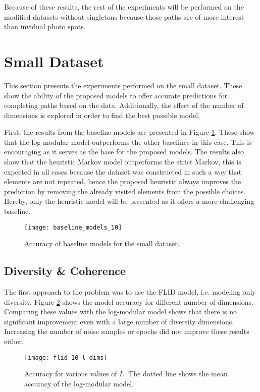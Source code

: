 Because of these results, the rest of the experiments will be performed on the modified datasets without singletons because those paths are of more interest than invidual photo spots.

\section{Small Dataset}

This section presents the experiments performed on the small dataset. These show the ability of the proposed models to offer accurate predictions for completing paths based on the data. Additionally, the effect of the number of dimensions is explored in order to find the best possible model.

First, the results from the baseline models are presented in Figure \ref{fig:small_baselines}. These show that the log-modular model outperforms the other baselines in this case. This is encouraging as it serves as the base for the proposed models. The results also show that the heuristic Markov model outperforms the strict Markov, this is expected in all cases because the dataset was constructed in such a way that elements are not repeated, hence the proposed heuristic always improves the prediction by removing the already visited elements from the possible choices. Hereby, only the heuristic model will be presented as it offers a more challenging baseline.

\begin{figure}
  \centering
  \texttt{[image: baseline\_models\_10]}
  \caption{Accuracy of baseline models for the small dataset.}
  \label{fig:small_baselines}
\end{figure}

\subsection{Diversity \& Coherence}

The first approach to the problem was to use the FLID model, i.e. modeling only diversity. Figure \ref{fig:flid_small_l_dims} shows the model accuracy for different number of dimensions. Comparing these values with the log-modular model shows that there is no significant improvement even with a large number of diversity dimensions. Increasing the number of noise samples or epochs did not improve these results either.

\begin{figure}
  \centering
  \texttt{[image: flid\_10\_l\_dims]}
  \caption{Accuracy for various values of $L$. The dotted line shows the mean accuracy of the log-modular model.}
  \label{fig:flid_small_l_dims}
\end{figure}

